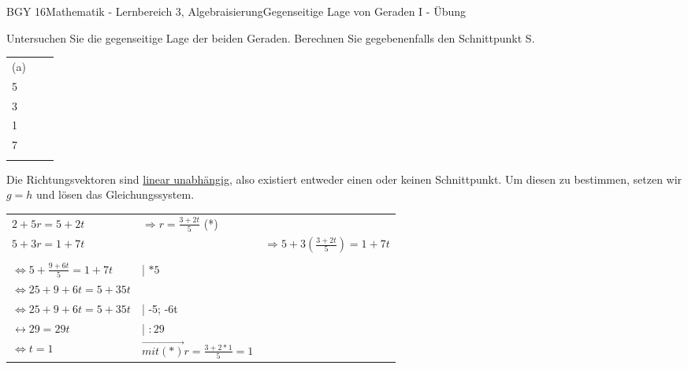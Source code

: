 \documentclass[oneside,openany,headings=optiontotoc,11pt,numbers=noenddot]{scrreprt}
\begin{document}
	\begin{worksheet}{BGY 16}{Mathematik - Lernbereich 3, Algebraisierung}{Gegenseitige Lage von Geraden I - Übung}
				
		\begin{framed}
			\noindent
			Untersuchen Sie die gegenseitige Lage der beiden Geraden. Berechnen Sie gegebenenfalls den Schnittpunkt S.\\
			\begin{tabularx}{\textwidth}{lXX}
				(a) & \(g: \vec{x} = \left(\begin{array}{c}2\\5\end{array}\right) + r\left(\begin{array}{c}5\\3\end{array}\right)\) &	\(h: \vec{x} = \left(\begin{array}{c}5\\1\end{array}\right) + t\left(\begin{array}{c}2\\7\end{array}\right)\)\\
				&&\\
			\end{tabularx}
			Die Richtungsvektoren sind \color{blue}\underline{linear unabhängig}\normalcolor{}, also existiert entweder \color{red}einen\normalcolor{} oder \color{red}keinen\normalcolor{} Schnittpunkt. Um diesen zu bestimmen, setzen wir \(g=h\) und lösen das Gleichungssystem.\\
			\par\noindent
			\begin{tabular}{lll}
				\(2+5r = 5 +2t\) & \(\Rightarrow r = \frac{3+2t}{5}\) (*)\\
				\(5+3r = 1 +7t\) & & \(\Rightarrow 5 + 3(\frac{3+2t}{5}) = 1 + 7t\)\\
				\hline\\
				\(\Leftrightarrow 5 + \frac{9 + 6t}{5} = 1 +7t\)& | \(* 5\)&\\
				\(\Leftrightarrow 25 + 9 +6t = 5 + 35t\) & &\\
				\(\Leftrightarrow 25 + 9 + 6t = 5 + 35t\) & | -5; -6t& \\
				\(\leftrightarrow 29 = 29t\) & | \(:29\) & \\
				\(\Leftrightarrow t = 1\) & \(\overrightarrow{mit (*)} r = \frac{3+2*1}{5} = 1\)
			\end{tabular}\\

\end{framed}
\end{worksheet}
\end{document}
